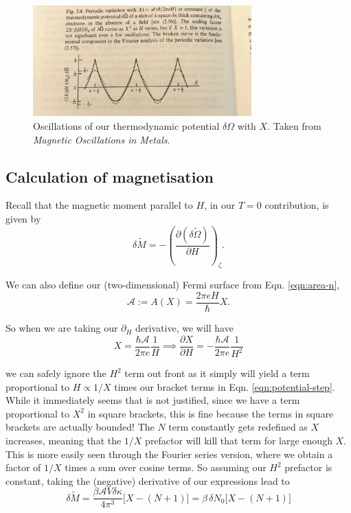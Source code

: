 \documentclass[12pt]{revtex4-2}
\begin{document}
\begin{figure}[tb]
\centering
\includegraphics[width=0.75\textwidth]{figures/oscillations_free_energy.jpg}
\caption{Oscillations of our thermodynamic potential $\delta\Omega$ with $X$.  Taken from \textit{Magnetic Oscillations in Metals}.}
\label{fig:oscillations-energy}
\end{figure}

\subsection{Calculation of magnetisation}

Recall that the magnetic moment parallel to $H$, in our $T=0$ contribution, is given by
\begin{equation}
    \delta \tilde{M} = -\left( \frac{\partial(\delta\tilde{\Omega})}{\partial H} \right)_\zeta.
\end{equation}

We can also define our (two-dimensional) Fermi surface from Eqn. \ref{eqn:area-n}, 
\begin{equation}
    \mathcal{A} := A(X) = \frac{2\pi eH}{\hbar}X.
\end{equation}

So when we are taking our $\partial_H$ derivative, we will have
\begin{equation}
    X = \frac{\hbar\mathcal{A}}{2\pi e}\frac{1}{H} \implies \frac{\partial X}{\partial H} = -\frac{\hbar\mathcal{A}}{2\pi e} \frac{1}{H^2}
\end{equation}

we can safely ignore the $H^2$ term out front as it simply will yield a term proportional to $H \propto 1/X$ times our bracket terms in Eqn. \ref{eqn:potential-step}.  While it immediately seems that is not justified, since we have a term proportional to $X^2$ in square brackets, this is fine because the terms in square brackets are actually bounded!  The $N$ term constantly gets redefined as $X$ increases, meaning that the $1/X$ prefactor will kill that term for large enough $X$.  This is more easily seen through the Fourier series version, where we obtain a factor of $1/X$ times a sum over cosine terms.  So assuming our $H^2$ prefactor is constant, taking the (negative) derivative of our expressions lead to
\begin{equation}
    \boxed{ \delta \tilde{M} = \frac{\beta\mathcal{A}V\delta\kappa}{4\pi^3} \big[ X - (N+1) \big] = \beta \, \delta N_0\big[ X - (N+1) \big]}
\end{equation}
\end{document}
